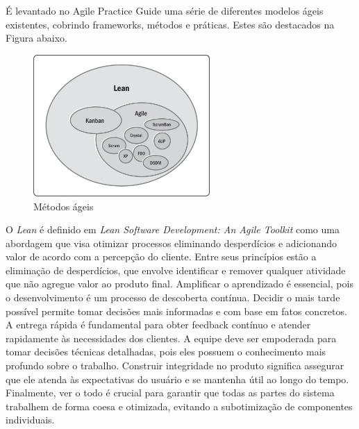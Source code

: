 \documentclass[
	12pt,
	openright,
	twoside,
	a4paper,
	english,
	brazil
	]{abntex2}
\begin{document}
É levantado no Agile Practice Guide \cite{AgileGuide} uma série de diferentes modelos ágeis existentes, cobrindo frameworks, métodos e práticas. Estes são destacados na Figura abaixo.

\begin{figure}[H]
  \centering
	\caption{\label{metodos-ageis}Métodos ágeis}
  \includegraphics[width=0.6\textwidth]{metodos-ageis}
\end{figure}

O \textit{Lean} é definido em \textit{Lean Software Development: An Agile Toolkit} \cite{Poppendieck_Poppendieck_2003} como uma abordagem que visa otimizar processos eliminando desperdícios e adicionando valor de acordo com a percepção do cliente. Entre seus princípios estão a eliminação de desperdícios, que envolve identificar e remover qualquer atividade que não agregue valor ao produto final. Amplificar o aprendizado é essencial, pois o desenvolvimento é um processo de descoberta contínua. Decidir o mais tarde possível permite tomar decisões mais informadas e com base em fatos concretos. A entrega rápida é fundamental para obter feedback contínuo e atender rapidamente às necessidades dos clientes. A equipe deve ser empoderada para tomar decisões técnicas detalhadas, pois eles possuem o conhecimento mais profundo sobre o trabalho. Construir integridade no produto significa assegurar que ele atenda às expectativas do usuário e se mantenha útil ao longo do tempo. Finalmente, ver o todo é crucial para garantir que todas as partes do sistema trabalhem de forma coesa e otimizada, evitando a subotimização de componentes individuais.
\end{document}
